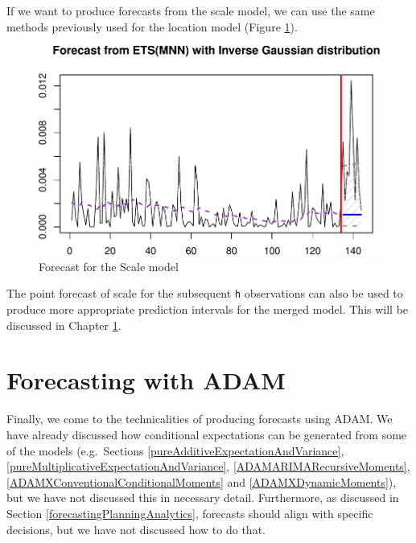 \documentclass[]{book}
\newenvironment{Shaded}{\begin{snugshade}}{\end{snugshade}}
\newcommand{\DataTypeTok}[1]{\textcolor[rgb]{0.13,0.29,0.53}{#1}}
\newcommand{\DecValTok}[1]{\textcolor[rgb]{0.00,0.00,0.81}{#1}}
\newcommand{\KeywordTok}[1]{\textcolor[rgb]{0.13,0.29,0.53}{\textbf{#1}}}
\newcommand{\NormalTok}[1]{#1}
\newcommand{\OperatorTok}[1]{\textcolor[rgb]{0.81,0.36,0.00}{\textbf{#1}}}
\newcommand{\StringTok}[1]{\textcolor[rgb]{0.31,0.60,0.02}{#1}}
\theoremstyle{definition}
\theoremstyle{definition}
\theoremstyle{definition}
\theoremstyle{definition}
\theoremstyle{remark}
\begin{document}
If we want to produce forecasts from the scale model, we can use the same methods previously used for the location model (Figure \ref{fig:adamModelAirScaleForecast}).

\begin{Shaded}
\end{Shaded}

\begin{figure}
\centering
\includegraphics{Svetunkov--2022----ADAM_files/figure-latex/adamModelAirScaleForecast-1.pdf}
\caption{\label{fig:adamModelAirScaleForecast}Forecast for the Scale model}
\end{figure}

The point forecast of scale for the subsequent \texttt{h} observations can also be used to produce more appropriate prediction intervals for the merged model. This will be discussed in Chapter \ref{ADAMForecasting}.

\hypertarget{ADAMForecasting}{%
\chapter{Forecasting with ADAM}\label{ADAMForecasting}}

Finally, we come to the technicalities of producing forecasts using ADAM. We have already discussed how conditional expectations can be generated from some of the models (e.g.~Sections \ref{pureAdditiveExpectationAndVariance}, \ref{pureMultiplicativeExpectationAndVariance}, \ref{ADAMARIMARecursiveMoments}, \ref{ADAMXConventionalConditionalMoments} and \ref{ADAMXDynamicMoments}), but we have not discussed this in necessary detail. Furthermore, as discussed in Section \ref{forecastingPlanningAnalytics}, forecasts should align with specific decisions, but we have not discussed how to do that.
\end{document}
